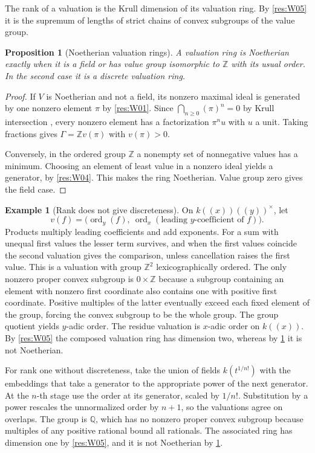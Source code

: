 \documentclass[11pt,oneside,openany]{book}
\newtheorem{proposition}[theorem]{Proposition}
\theoremstyle{definition}
\newtheorem{example}[theorem]{Example}
\theoremstyle{remark}
\begin{document}
The rank of a valuation is the Krull dimension of its valuation ring. By \ref{res:W05} it is the supremum of lengths of strict chains of convex subgroups of the value group.

\begin{proposition}[Noetherian valuation rings]\label{res:W06}
A valuation ring is Noetherian exactly when it is a field or has value group isomorphic to \(\mathbb Z\) with its usual order. In the second case it is a discrete valuation ring.
\end{proposition}
\begin{proof}
If \(V\) is Noetherian and not a field, its nonzero maximal ideal is generated by one nonzero element \(\pi\) by \ref{res:W01}. Since \(\bigcap_{n\ge0}(\pi)^n=0\) by Krull intersection \cite[ALG-05-C04-R04]{p103}, every nonzero element has a factorization \(\pi^n u\) with \(u\) a unit. Taking fractions gives \(\Gamma=\mathbb Z v(\pi)\) with \(v(\pi)>0\).

Conversely, in the ordered group \(\mathbb Z\) a nonempty set of nonnegative values has a minimum. Choosing an element of least value in a nonzero ideal yields a generator, by \ref{res:W04}. This makes the ring Noetherian. Value group zero gives the field case.
\end{proof}

\begin{example}[Rank does not give discreteness]\label{res:W07}
On \(k((x))((y))^\times\), let
\[
 v(f)=\bigl(\operatorname{ord}_y(f),\
       \operatorname{ord}_x(\text{leading \(y\)-coefficient of }f)\bigr).
\]
Products multiply leading coefficients and add exponents. For a sum with unequal first values the lesser term survives, and when the first values coincide the second valuation gives the comparison, unless cancellation raises the first value. This is a valuation with group \(\mathbb Z^2\) lexicographically ordered. The only nonzero proper convex subgroup is \(0\times\mathbb Z\) because a subgroup containing an element with nonzero first coordinate also contains one with positive first coordinate. Positive multiples of the latter eventually exceed each fixed element of the group, forcing the convex subgroup to be the whole group. The group quotient yields \(y\)-adic order. The residue valuation is \(x\)-adic order on \(k((x))\). By \ref{res:W05} the composed valuation ring has dimension two, whereas by \ref{res:W06} it is not Noetherian.

For rank one without discreteness, take the union of fields \(k(t^{1/n!})\) with the embeddings that take a generator to the appropriate power of the next generator. At the \(n\)-th stage use the order at its generator, scaled by \(1/n!\). Substitution by a power rescales the unnormalized order by \(n+1\), so the valuations agree on overlaps. The group is \(\mathbb Q\), which has no nonzero proper convex subgroup because multiples of any positive rational bound all rationals. The associated ring has dimension one by \ref{res:W05}, and it is not Noetherian by \ref{res:W06}.
\end{example}
\end{document}
